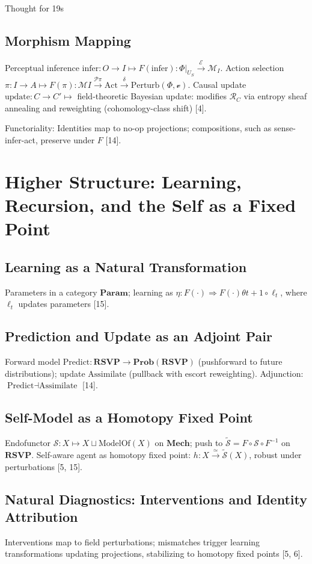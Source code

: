 Thought for 19s\documentclass{article}
\begin{document}
\subsection{Morphism Mapping}

Perceptual inference $\text{infer}: O \to I \mapsto F(\text{infer}): \Phi|_{U_S} \xrightarrow{\mathcal{E}} \mathcal{M}_I$.
Action selection $\pi: I \to A \mapsto F(\pi): \mathcal{M}I \xrightarrow{\mathcal{P}\pi} \text{Act} \xrightarrow{\delta} \text{Perturb}(\Phi, \mathcal{v})$.
Causal update $\text{update}: C \to C' \mapsto$ field-theoretic Bayesian update: modifies $\mathcal{R}_C$ via entropy sheaf annealing and reweighting (cohomology-class shift) [4].

Functoriality: Identities map to no-op projections; compositions, such as sense-infer-act, preserve under $F$ [14].
\section{Higher Structure: Learning, Recursion, and the Self as a Fixed Point}
\subsection{Learning as a Natural Transformation}
Parameters in a category $\mathbf{Param}$; learning as $\eta: F(\cdot) \Rightarrow F(\cdot){\theta{t+1}} \circ \ell_t$, where $\ell_t$ updates parameters [15].
\subsection{Prediction and Update as an Adjoint Pair}
Forward model $\text{Predict}: \mathbf{RSVP} \to \mathbf{Prob}(\mathbf{RSVP})$ (pushforward to future distributions); update $\text{Assimilate}$ (pullback with escort reweighting). Adjunction: $\text{Predict} \dashv \text{Assimilate}$ [14].
\subsection{Self-Model as a Homotopy Fixed Point}
Endofunctor $\mathcal{S}: X \mapsto X \sqcup \text{ModelOf}(X)$ on $\mathbf{Mech}$; push to $\widetilde{\mathcal{S}} = F \circ \mathcal{S} \circ F^{-1}$ on $\mathbf{RSVP}$. Self-aware agent as homotopy fixed point: $h: X \overset{\simeq}{\to} \widetilde{\mathcal{S}}(X)$, robust under perturbations [5, 15].
\subsection{Natural Diagnostics: Interventions and Identity Attribution}
Interventions map to field perturbations; mismatches trigger learning transformations updating projections, stabilizing to homotopy fixed points [5, 6].
\end{document}
